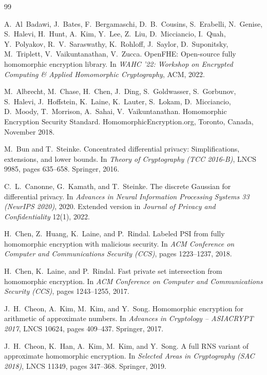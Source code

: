\begin{thebibliography}{99}\small

A.~Al~Badawi, J.~Bates, F.~Bergamaschi, D.~B.~Cousins, S.~Erabelli, N.~Genise, S.~Halevi, H.~Hunt, A.~Kim, Y.~Lee, Z.~Liu, D.~Micciancio, I.~Quah, Y.~Polyakov, R.~V.~Saraswathy, K.~Rohloff, J.~Saylor, D.~Suponitsky, M.~Triplett, V.~Vaikuntanathan, V.~Zucca.
\newblock OpenFHE: Open-source fully homomorphic encryption library.
\newblock In \emph{WAHC '22: Workshop on Encrypted Computing \& Applied Homomorphic Cryptography}, ACM, 2022.

M.~Albrecht, M.~Chase, H.~Chen, J.~Ding, S.~Goldwasser, S.~Gorbunov, S.~Halevi, J.~Hoffstein, K.~Laine, K.~Lauter, S.~Lokam, D.~Micciancio, D.~Moody, T.~Morrison, A.~Sahai, V.~Vaikuntanathan.
\newblock Homomorphic Encryption Security Standard.
\newblock HomomorphicEncryption.org, Toronto, Canada, November 2018.

M.~Bun and T.~Steinke.
\newblock Concentrated differential privacy: Simplifications, extensions, and lower bounds.
\newblock In \emph{Theory of Cryptography (TCC 2016-B)}, LNCS 9985, pages 635--658. Springer, 2016.

C.~L.~Canonne, G.~Kamath, and T.~Steinke.
\newblock The discrete Gaussian for differential privacy.
\newblock In \emph{Advances in Neural Information Processing Systems 33 (NeurIPS 2020)}, 2020.
\newblock Extended version in \emph{Journal of Privacy and Confidentiality} 12(1), 2022.

H.~Chen, Z.~Huang, K.~Laine, and P.~Rindal.
\newblock Labeled PSI from fully homomorphic encryption with malicious security.
\newblock In \emph{ACM Conference on Computer and Communications Security (CCS)}, pages 1223--1237, 2018.

H.~Chen, K.~Laine, and P.~Rindal.
\newblock Fast private set intersection from homomorphic encryption.
\newblock In \emph{ACM Conference on Computer and Communications Security (CCS)}, pages 1243--1255, 2017.

J.~H.~Cheon, A.~Kim, M.~Kim, and Y.~Song.
\newblock Homomorphic encryption for arithmetic of approximate numbers.
\newblock In \emph{Advances in Cryptology -- ASIACRYPT 2017}, LNCS 10624, pages 409--437. Springer, 2017.

J.~H.~Cheon, K.~Han, A.~Kim, M.~Kim, and Y.~Song.
\newblock A full RNS variant of approximate homomorphic encryption.
\newblock In \emph{Selected Areas in Cryptography (SAC 2018)}, LNCS 11349, pages 347--368. Springer, 2019.


\end{thebibliography}
